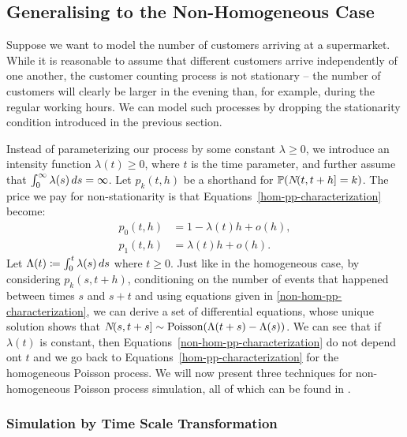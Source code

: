 \documentclass[report.tex]{subfiles}
\begin{document}
\subsection{Generalising to the Non-Homogeneous Case}
\label{non-hom-pp-background}

Suppose we want to model the number of customers arriving at a supermarket.
While it is reasonable to assume that different customers arrive independently
of one another, the customer counting process is not stationary -- the number
of customers will clearly be larger in the evening than, for example, during
the regular working hours.
We can model such processes by dropping the stationarity condition introduced
in the previous section.

Instead of parameterizing our process by some constant $\lambda \geq 0$, we introduce
an intensity function $\lambda(t) \geq 0$, where $t$ is the time parameter, and
further assume that $\int_{{0}}^{{\infty}} {\lambda(s)}\, d{s} = \infty$.
Let $p_{k}(t, h)$ be a shorthand for $\mathbb{P}\!\left({{N}\!({t},{t+h}] = k}\right)$.
The price we pay for non-stationarity is that Equations~\ref{hom-pp-characterization}
become:
\begin{equation}
\begin{split}
  \label{non-hom-pp-characterization}
  p_{0}(t, h) &= 1 - \lambda(t) h + o(h), \\
  p_{1}(t, h) &= \lambda(t) h + o(h).
\end{split}
\end{equation}
Let $\Lambda(t) \coloneqq \int_{{0}}^{{t}} {\lambda(s)}\, d{s}$ where $t \geq 0$.
Just like in the homogeneous case, by considering $p_{k}(s, t + h)$,
conditioning on the number of events that happened between times $s$ and $s + t$
and using equations given in \ref{non-hom-pp-characterization},
we can derive a set of differential equations, whose unique solution shows that
${N}\!({s},{t+s}] \sim \text{Poisson}(\Lambda(t+s) - \Lambda(s))$.
We can see that if $\lambda(t)$ is constant, then Equations~\ref{non-hom-pp-characterization}
do not depend ont $t$ and we go back to Equations~\ref{hom-pp-characterization}
for the homogeneous Poisson process.
We will now present three techniques for non-homogeneous Poisson process simulation,
all of which can be found in \citet{devroye2013non}.

\subsubsection{Simulation by Time Scale Transformation}
\end{document}
